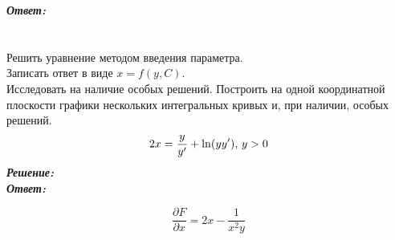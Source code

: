 \documentclass[a5paper, 10pt]{article}
\theoremstyle{definition}
\theoremstyle{plain}
\theoremstyle{remark}
\begin{document}
\textit{\textbf{Ответ:}}

\newpage
\section{}
Решить уравнение методом введения параметра. \\
Записать ответ в виде $x = f(y, C)$.\\
Исследовать на наличие особых решений. Построить на одной координатной плоскости графики нескольких интегральных кривых и, при наличии, особых решений.
\begin{equation*}
2x = \frac{y}{y'} + \ln (yy'), \, y >0\\
\end{equation*}
\textit{\textbf{Решение:}}\\


\textit{\textbf{Ответ:}}


\begin{equation*}
\frac{\partial F}{\partial x} =  2x - \frac{1}{x^2y}
\end{equation*}
\end{document}
